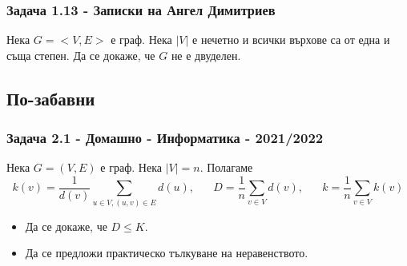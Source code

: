 \documentclass[12pt]{article}
\begin{document}
\subsubsection*{Задача 1.13 - Записки на Ангел Димитриев}
Нека $G = <V, E>$ е граф. Нека $|V|$ е нечетно и всички върхове са от една и съща степен. Да се докаже, че $G$ не е двуделен. 

\subsection*{По-забавни}
\subsubsection*{Задача 2.1 - Домашно - Информатика - 2021/2022}
Нека $G = (V, E)$ е граф. Нека $|V| = n$. Полагаме
\begin{equation*}
    k(v) = \frac{1}{d(v)} \displaystyle\sum_{u \in V, (u, v) \in E} d(u), \; \; \; \; \; \; D = \frac{1}{n}\displaystyle\sum_{v \in V} d(v), \; \; \; \; \; \; k = \frac{1}{n}\displaystyle\sum_{v \in V} k(v) 
\end{equation*}
\begin{itemize}
    \item Да се докаже, че $D \leq K$.
    \item Да се предложи практическо тълкуване на неравенството.
\end{itemize}
\end{document}
